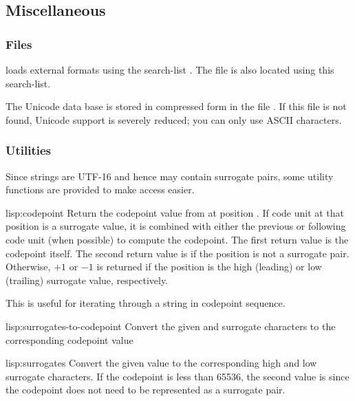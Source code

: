 \subsection{Miscellaneous}


\subsubsection{Files}

\cmucl{} loads external formats using the search-list
.  The  file is also located using
this search-list.

The Unicode data base is stored in compressed form in the file
.  If this file is not found, Unicode
support is severely reduced; you can only use ASCII characters.

\subsubsection{Utilities}

Since strings are UTF-16 and hence may contain surrogate pairs, some
utility functions are provided to make access easier.

\begin{defun}{lisp:}{codepoint}{\args {} 
    \ampoptional{} }
  Return the codepoint value from  at position .
  If code unit at that position is a surrogate value, it is combined
  with either the previous or following code unit (when possible) to
  compute the codepoint.  The first return value is the codepoint
  itself.  The second return value is \nil{} if the position is not a
  surrogate pair.  Otherwise, $+1$ or $-1$ is returned if the position
  is the high (leading) or low (trailing) surrogate value, respectively.

  This is useful for iterating through a string in codepoint sequence.
\end{defun}

\begin{defun}{lisp:}{surrogates-to-codepoint}{\args {} }
  Convert the given  and  surrogate characters to the
  corresponding codepoint value
\end{defun}

\begin{defun}{lisp:}{surrogates}{\args {}}
  Convert the given  value to the corresponding high
  and low surrogate characters.  If the codepoint is less than 65536,
  the second value is \nil{} since the codepoint does not need to be
  represented as a surrogate pair.
\end{defun}

